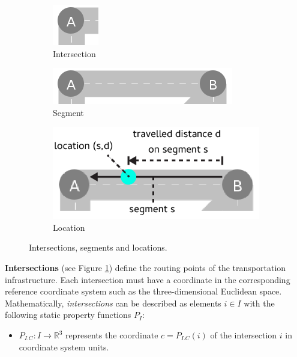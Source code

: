 \documentclass[graybox]{svmult}
\begin{document}
\begin{figure}[htbp]
	\centering
	\begin{subfigure}{.2\textwidth}
		\centering
		\includegraphics[scale=0.4]{../../concepts/intersection.png}
		\caption{Intersection}
		\label{fig:intersection}
	\end{subfigure}
	\begin{subfigure}{.35\textwidth}
		\centering
		\includegraphics[scale=0.4]{../../concepts/segment.png}
		\caption{Segment}
		\label{fig:segment}
	\end{subfigure}
	\begin{subfigure}{.35\textwidth}
		\centering
		\includegraphics[scale=0.4]{../../concepts/location.png}
		\caption{Location}
		\label{fig:location}
	\end{subfigure}
	\caption{Intersections, segments and locations.}
	\label{fig:intersections-segments}	
\end{figure}

\vspace{2mm}

\noindent \textbf{Intersections} (see Figure \ref{fig:intersection}) define the routing points of the transportation infrastructure.
Each intersection must have a coordinate in the corresponding reference coordinate system such as the three-dimensional Euclidean space.
Mathematically, \textit{intersections} can be described as elements $i \in I$ with the following static property functions $P_{I}$:
\begin{itemize}
	\item $P_{I.C}: I \rightarrow \mathbb{R}^3$ represents the coordinate $c = P_{I.C}(i)$ of the intersection $i$ in coordinate system units.
\end{itemize}
\end{document}
